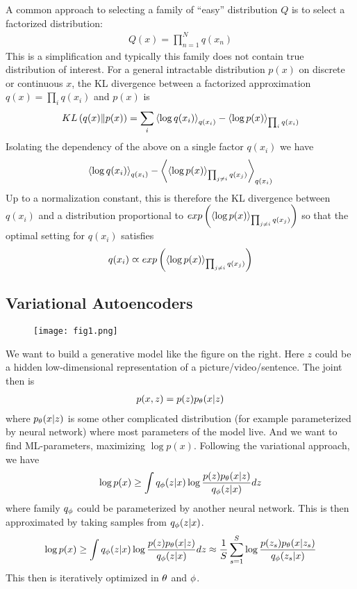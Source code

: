 A common approach to selecting a family of ``easy'' distribution $Q$ is to select a factorized distribution:
\begin{align*}
	Q(x)=\prod_{n=1}^Nq(x_n)
\end{align*}
This is a simplification and typically this family does not contain true distribution of interest. For a general intractable distribution $p(x)$ on discrete or continuous $x$, the KL divergence between a factorized approximation $q(x)=\prod_iq(x_i)$ and $p(x)$ is
\begin{align*}
	KL\left(q(x)\|p(x)\right)=\sum_i\left\langle\log q(x_i)\right\rangle_{q(x_i)}-\left\langle\log p(x)\right\rangle_{\prod_iq(x_i)}
\end{align*}
Isolating the dependency of the above on a single factor $q(x_i)$ we have
\begin{align*}
	\left\langle\log q(x_i)\right\rangle_{q(x_i)}-\left\langle\left\langle\log p(x)\right\rangle_{\prod_{j\neq i}q(x_j)}\right\rangle_{q(x_i)}
\end{align*}
Up to a normalization constant, this is therefore the KL divergence between $q(x_i)$ and a distribution proportional to $exp\left(\left\langle\log p(x)\right\rangle_{\prod_{j\neq i}q(x_j)}\right)$ so that the optimal setting for $q(x_i)$ satisfies
\begin{align*}
	q(x_i)\varpropto exp\left(\left\langle\log p(x)\right\rangle_{\prod_{j\neq i}q(x_j)}\right)
\end{align*}

\subsection{Variational Autoencoders}

\begin{wrapfigure}{r}{0.4\textwidth}
	\vspace*{-0.7cm}
	\texttt{[image: fig1.png]}
\end{wrapfigure}
We want to build a generative model like the figure on the right. Here $z$ could be a hidden low-dimensional representation of a picture/video/sentence. The joint then is
\begin{align*}
	p(x,z)=p(z)p_\theta(x|z)
\end{align*}
where $p_\theta(x|z)$ is some other complicated distribution (for example parameterized by neural network) where most parameters of the model live. And we want to find ML-parameters, maximizing $\log p(x)$. Following the variational approach, we have
\begin{align*}
	\log p(x)\geq \int q_\phi(z|x)\log\frac{p(z)p_\theta(x|z)}{q_\phi(z|x)}dz
\end{align*}
where family $q_\phi$ could be parameterized by another neural network. This is then approximated by taking samples from $q_\phi(z|x)$.
\begin{align*}
	\log p(x)\geq\int q_\phi(z|x)\log\frac{p(z)p_\theta(x|z)}{q_\phi(z|x)}dz\approx\frac{1}{S}\sum_{s=1}^S\log\frac{p(z_s)p_\theta(x|z_s)}{q_\phi(z_s|x)}
\end{align*}
This then is iteratively optimized in $\theta$ and $\phi$.
